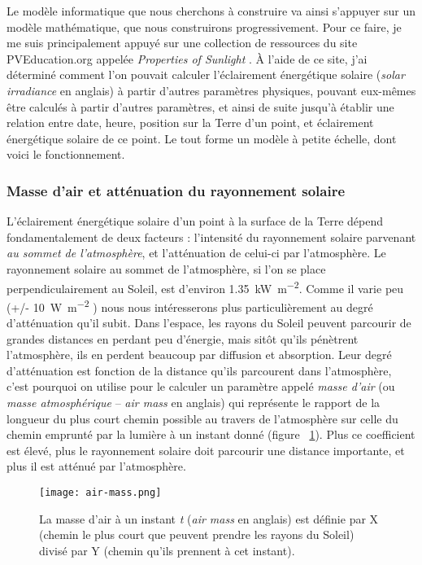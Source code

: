 \documentclass[12pt]{article}
\begin{document}
Le modèle informatique que nous cherchons à construire va ainsi s'appuyer sur un modèle mathématique, que nous construirons progressivement.
Pour ce faire, je me suis principalement appuyé sur une collection de ressources du site PVEducation.org appelée \emph{Properties of Sunlight} \cite{properties_of_sunlight}.
À l'aide de ce site, j'ai déterminé comment l'on pouvait calculer l'éclairement énergétique solaire (\textit{solar irradiance} en anglais) à partir d'autres paramètres physiques, pouvant eux-mêmes être calculés à partir d'autres paramètres, et ainsi de suite jusqu'à établir une relation entre date, heure, position sur la Terre d'un point, et éclairement énergétique solaire de ce point.
Le tout forme un modèle à petite échelle, dont voici le fonctionnement.

\subsubsection{Masse d'air et atténuation du rayonnement solaire}
L'éclairement énergétique solaire d'un point à la surface de la Terre dépend fondamentalement de deux facteurs : l'intensité du rayonnement solaire parvenant \emph{au sommet de l'atmosphère}, et l'atténuation de celui-ci par l'atmosphère. 
Le rayonnement solaire au sommet de l'atmosphère, si l'on se place perpendiculairement au Soleil, est d'environ \SI{1.35}{\kilo\watt\per\square\meter}.
Comme il varie peu (+/- \SI{10}{\watt\per\square\meter} ) nous nous intéresserons plus particulièrement au degré d'atténuation qu'il subit.
Dans l'espace, les rayons du Soleil peuvent parcourir de grandes distances en perdant peu d'énergie, mais sitôt qu'ils pénètrent l'atmosphère, ils en perdent beaucoup par diffusion et absorption.
Leur degré d'atténuation est fonction de la distance qu'ils parcourent dans l'atmosphère, c'est pourquoi on utilise pour le calculer un paramètre appelé \emph{masse d'air} (ou \emph{masse atmosphérique} -- \textit{air mass} en anglais) \cite{air_mass_wiki} qui représente le rapport de la longueur du plus court chemin possible au travers de l'atmosphère sur celle du chemin emprunté par la lumière à un instant donné (figure ~\ref{fig:air-mass}). Plus ce coefficient est élevé, plus le rayonnement solaire doit parcourir une distance importante, et plus il est atténué par l'atmosphère.

\begin{figure}[!ht]
	\centerline{\texttt{[image: air-mass.png]}}
	\caption{La masse d'air à un instant \textit{t} (\textit{air mass} en anglais) est définie par X (chemin le plus court que peuvent prendre les rayons du Soleil) divisé par Y (chemin qu'ils prennent à cet instant).}
	\label{fig:air-mass}
\end{figure}
\end{document}

